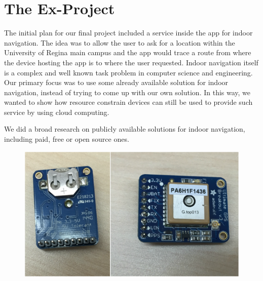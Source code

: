 \chapter{The Ex-Project}
\label{sec:ex-project}


The initial plan for our final project included a service inside the app for indoor navigation.
The idea was to allow the user to ask for a location within the University of Regina main campus and the app would trace a route from where the device hosting the app is to where the user requested.
Indoor navigation itself is a complex and well known task problem in computer science and engineering.
Our primary focus was to use some already available solution for indoor navigation, instead of trying to come up with our own solution.
In this way, we wanted to show how resource constrain devices can still be used to provide such service by using cloud computing.

We did a broad research on publicly available solutions for indoor navigation, including paid, free or open source ones.

\begin{figure}
\label{fig:console}
\centerline{
\includegraphics[width=\textwidth]{figures/chip_gps.png}
}
\caption{}
\end{figure}